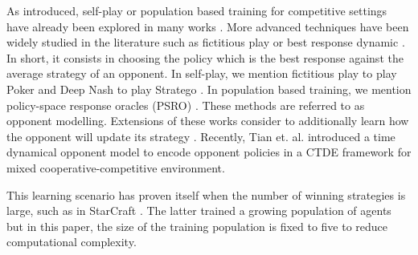 As introduced, self-play or population based training for competitive settings have already been explored in many works \citep{jaderberg2019human, vinyals2019grandmaster, baker2019emergent}.
More advanced techniques have been widely studied in the literature such as fictitious play \cite{brown1951iterative} or best response dynamic \citep{baudin2022fictitious}.
In short, it consists in choosing the policy which is the best response against the average strategy of an opponent.
In self-play, we mention fictitious play to play Poker \citep{pmlr-v37-heinrich15} and Deep Nash to play Stratego \citep{DM_stratego}.
In population based training, we mention policy-space response oracles (PSRO) \citep{NIPS2017_3323fe11, Muller2020A}.
These methods are referred to as opponent modelling.
Extensions of these works consider to additionally learn how the opponent will update its strategy \citep{he2016opponent, foerster2017learning}.
Recently, Tian et. al. \citep{tian2022multi} introduced a time dynamical opponent model to encode opponent policies in a CTDE framework for mixed cooperative-competitive environment.


This learning scenario has proven itself when the number of winning strategies is large, such as in StarCraft \citep{vinyals2019grandmaster}.
The latter trained a growing population of agents but in this paper, the size of the training population is fixed to five to reduce computational complexity.